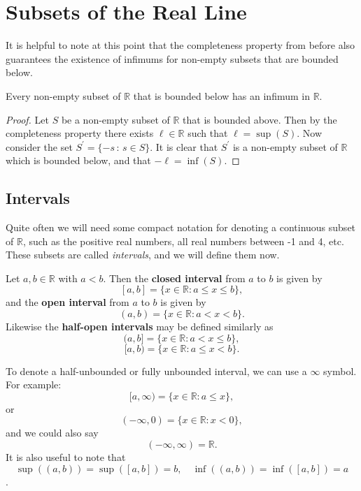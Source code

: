 \documentclass[../real_analysis.tex]{subfiles}
\begin{document}
    \section{Subsets of the Real Line}\label{sec:subsets-of-the-real-line}
        It is helpful to note at this point that the completeness property from before also guarantees the existence of infimums for non-empty subsets that are bounded below.
        \begin{theorem}
            Every non-empty subset of $\mathbb{R}$ that is bounded below has an infimum in $\mathbb{R}$.
        \end{theorem}
        \begin{proof}
            Let $S$ be a non-empty subset of $\mathbb{R}$ that is bounded above. Then by the completeness property there exists $\ell\in\mathbb{R}$ such that $\ell=\sup(S)$.
            Now consider the set $S^\prime=\{-s\,:\,s\in S\}$. It is clear that $S^\prime$ is a non-empty subset of $\mathbb{R}$ which is bounded below, and that $-\ell=\inf(S)$.
        \end{proof}

        \subsection{Intervals}\label{subsec:intervals}
            Quite often we will need some compact notation for denoting a continuous subset of $\mathbb{R}$, such as the positive real numbers, all real numbers between -1 and 4, etc. These subsets are called \textit{intervals}, and we will define them now.
            \begin{definition}
                Let $a, b \in \mathbb{R}$ with $a<b$. Then the \textbf{closed interval} from $a$ to $b$ is given by
                \[[a, b] = \{x \in \mathbb{R} : a \leq x \leq b\},\]
                and the \textbf{open interval} from $a$ to $b$ is given by
                \[(a, b) = \{x \in \mathbb{R} : a < x < b\}.\]
                Likewise the \textbf{half-open intervals} may be defined similarly as
                \[(a, b] = \{x \in \mathbb{R} : a < x \leq b\},\]
                \[[a, b) = \{x \in \mathbb{R} : a \leq x < b\}.\]
            \end{definition}
            To denote a half-unbounded or fully unbounded interval, we can use a $\infty$ symbol. For example:
            \[[a, \infty) = \{x \in \mathbb{R} : a \leq x\},\]
            or
            \[(-\infty, 0) = \{x \in \mathbb{R} : x < 0\},\]
            and we could also say
            \[(-\infty, \infty) = \mathbb{R}.\]
            It is also useful to note that
            \[\sup((a, b))=\sup([a, b])=b,\quad\inf((a, b))=\inf([a, b])=a\].
\end{document}
